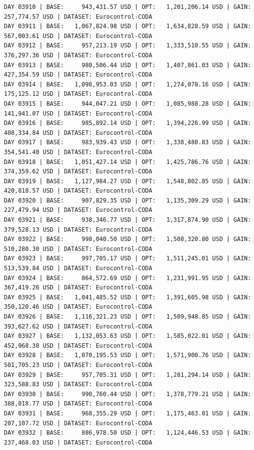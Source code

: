 \documentclass[11pt,a4paper]{article}
\begin{document}
\begin{verbatim}
DAY 03910 | BASE:     943,431.57 USD | OPT:   1,201,206.14 USD | GAIN: 257,774.57 USD | DATASET: Eurocontrol-CODA
DAY 03911 | BASE:   1,067,824.98 USD | OPT:   1,634,828.59 USD | GAIN: 567,003.61 USD | DATASET: Eurocontrol-CODA
DAY 03912 | BASE:     957,213.19 USD | OPT:   1,333,510.55 USD | GAIN: 376,297.36 USD | DATASET: Eurocontrol-CODA
DAY 03913 | BASE:     980,506.44 USD | OPT:   1,407,861.03 USD | GAIN: 427,354.59 USD | DATASET: Eurocontrol-CODA
DAY 03914 | BASE:   1,098,953.03 USD | OPT:   1,274,078.16 USD | GAIN: 175,125.12 USD | DATASET: Eurocontrol-CODA
DAY 03915 | BASE:     944,047.21 USD | OPT:   1,085,988.28 USD | GAIN: 141,941.07 USD | DATASET: Eurocontrol-CODA
DAY 03916 | BASE:     985,892.14 USD | OPT:   1,394,226.99 USD | GAIN: 408,334.84 USD | DATASET: Eurocontrol-CODA
DAY 03917 | BASE:     983,939.43 USD | OPT:   1,338,480.83 USD | GAIN: 354,541.40 USD | DATASET: Eurocontrol-CODA
DAY 03918 | BASE:   1,051,427.14 USD | OPT:   1,425,786.76 USD | GAIN: 374,359.62 USD | DATASET: Eurocontrol-CODA
DAY 03919 | BASE:   1,127,984.27 USD | OPT:   1,548,802.85 USD | GAIN: 420,818.57 USD | DATASET: Eurocontrol-CODA
DAY 03920 | BASE:     907,829.35 USD | OPT:   1,135,309.29 USD | GAIN: 227,479.94 USD | DATASET: Eurocontrol-CODA
DAY 03921 | BASE:     938,346.77 USD | OPT:   1,317,874.90 USD | GAIN: 379,528.13 USD | DATASET: Eurocontrol-CODA
DAY 03922 | BASE:     998,040.50 USD | OPT:   1,508,320.80 USD | GAIN: 510,280.30 USD | DATASET: Eurocontrol-CODA
DAY 03923 | BASE:     997,705.17 USD | OPT:   1,511,245.01 USD | GAIN: 513,539.84 USD | DATASET: Eurocontrol-CODA
DAY 03924 | BASE:     864,572.69 USD | OPT:   1,231,991.95 USD | GAIN: 367,419.26 USD | DATASET: Eurocontrol-CODA
DAY 03925 | BASE:   1,041,485.52 USD | OPT:   1,391,605.98 USD | GAIN: 350,120.46 USD | DATASET: Eurocontrol-CODA
DAY 03926 | BASE:   1,116,321.23 USD | OPT:   1,509,948.85 USD | GAIN: 393,627.62 USD | DATASET: Eurocontrol-CODA
DAY 03927 | BASE:   1,132,053.63 USD | OPT:   1,585,022.01 USD | GAIN: 452,968.38 USD | DATASET: Eurocontrol-CODA
DAY 03928 | BASE:   1,070,195.53 USD | OPT:   1,571,900.76 USD | GAIN: 501,705.23 USD | DATASET: Eurocontrol-CODA
DAY 03929 | BASE:     957,705.31 USD | OPT:   1,281,294.14 USD | GAIN: 323,588.83 USD | DATASET: Eurocontrol-CODA
DAY 03930 | BASE:     990,760.44 USD | OPT:   1,378,779.21 USD | GAIN: 388,018.77 USD | DATASET: Eurocontrol-CODA
DAY 03931 | BASE:     968,355.29 USD | OPT:   1,175,463.01 USD | GAIN: 207,107.72 USD | DATASET: Eurocontrol-CODA
DAY 03932 | BASE:     886,978.50 USD | OPT:   1,124,446.53 USD | GAIN: 237,468.03 USD | DATASET: Eurocontrol-CODA

\end{verbatim}
\end{document}
